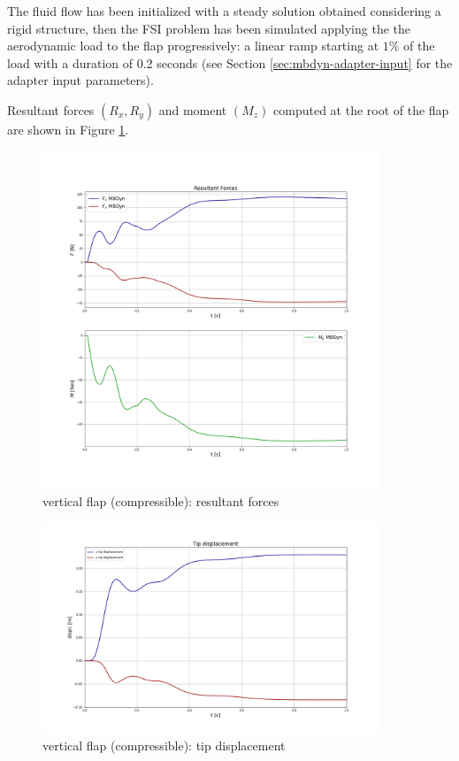 The fluid flow has been initialized with a steady solution obtained considering a rigid structure, then the FSI problem has been simulated applying the the aerodynamic load to the flap progressively: a linear ramp starting at $1\%$ of the load with a duration of 0.2 seconds (see Section \ref{sec:mbdyn-adapter-input} for the adapter input parameters).

Resultant forces $(R_x, R_y)$ and moment $(M_z)$ computed at the root of the flap are shown in Figure \ref{fig:comp_force}.

\begin{figure}[htbp!]
	\centering
	\includegraphics[width=0.9\textwidth, trim=0 100 0 100, clip]{images/comp_flap/forces_comp.png}
	\caption{vertical flap (compressible): resultant forces}
	\label{fig:comp_force}
\end{figure}



\begin{figure}[htbp!]
	\centering
	\includegraphics[width=0.9\textwidth, trim=0 50 0 50, clip]{images/comp_flap/disp_comp.png}
	\caption{vertical flap (compressible): tip displacement}
	\label{fig:comp_displacement}
\end{figure}


